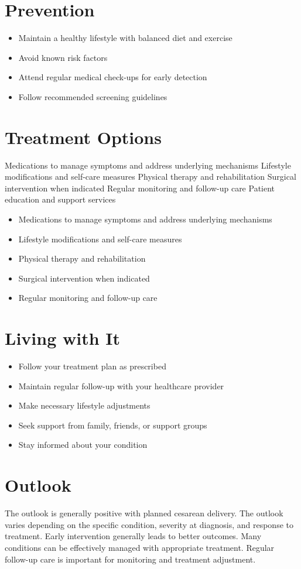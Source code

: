 \section{Prevention}
\begin{itemize}[noitemsep]
  \item Maintain a healthy lifestyle with balanced diet and exercise
  \item Avoid known risk factors
  \item Attend regular medical check-ups for early detection
  \item Follow recommended screening guidelines
\end{itemize}
\section{Treatment Options}
Medications to manage symptoms and address underlying mechanisms Lifestyle modifications and self-care measures Physical therapy and rehabilitation Surgical intervention when indicated Regular monitoring and follow-up care Patient education and support services

\begin{itemize}[noitemsep]
  \item Medications to manage symptoms and address underlying mechanisms
  \item Lifestyle modifications and self-care measures
  \item Physical therapy and rehabilitation
  \item Surgical intervention when indicated
  \item Regular monitoring and follow-up care
\end{itemize}
\section{Living with It}
\begin{itemize}[noitemsep]
  \item Follow your treatment plan as prescribed
  \item Maintain regular follow-up with your healthcare provider
  \item Make necessary lifestyle adjustments
  \item Seek support from family, friends, or support groups
  \item Stay informed about your condition
\end{itemize}
\section{Outlook}
The outlook is generally positive with planned cesarean delivery. The outlook varies depending on the specific condition, severity at diagnosis, and response to treatment. Early intervention generally leads to better outcomes. Many conditions can be effectively managed with appropriate treatment. Regular follow-up care is important for monitoring and treatment adjustment.
